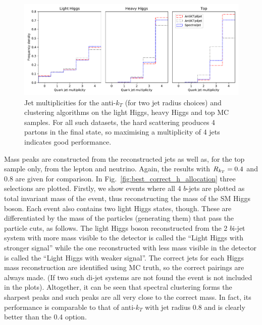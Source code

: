 \begin{figure}[htp]
    \begin{center}
        \includegraphics[width=1.0\textwidth]{graphics/multiplicity/multiplicity}
    \end{center}
    \caption{Jet multiplicities for the anti-$k_T$ (for two jet radius choices) and \spectral{} clustering algorithms on the light Higgs, heavy Higgs and top MC 
 samples. For all such datasets, the hard scattering produces  4 partons in the final  state, so maximising a multiplicity of 4 jets indicates good performance.   
    }\label{fig:multiplicity}
\end{figure}    



Mass peaks are constructed from the reconstructed jets as well as, for the top sample only, from the lepton and neutrino.
Again, the \antikt{} results  with \(R{}_{k_T} = 0.4\) and \(0.8\) are given for comparison.
In Fig.~\ref{fig:best_correct_h_allocation} three selections are plotted. Firstly, we show events where all 4 $b$-jets  
are plotted as total invariant mass of the event, thus reconstructing the mass of the SM Higgs boson.
Each event also contains two light Higgs states, though. These are differentiated by the mass of the particles (generating them) that pass the particle cuts,
as follows. The light Higgs boson reconstructed from the 2 $b$i-jet system with more mass visible to the detector is called the ``Light Higgs with stronger signal''
while the one reconstructed  with less mass visible in the detector is called the ``Light Higgs with weaker signal''.
The correct jets for each Higgs mass reconstruction are identified using MC truth,
so the correct pairings are always made. (If two such di-jet systems are not found the event is not included in the plots).
Altogether, it can be seen that spectral clustering forms the sharpest peaks and such peaks are all very close to the correct mass. In fact, its performance
is comparable to that of anti-$k_T$ with jet radius 0.8 and is clearly better than the 0.4 option. 


